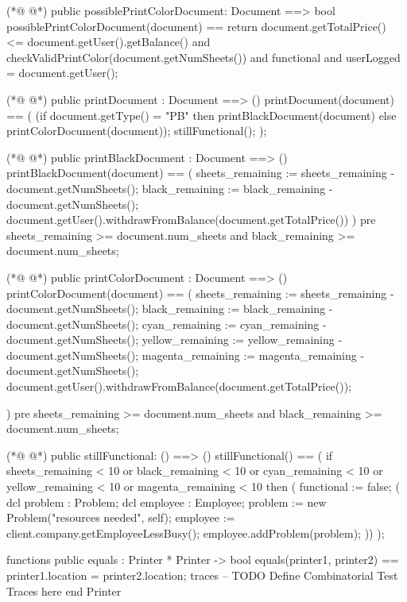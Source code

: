 \begin{vdmpp}[breaklines=true]
(*@
\label{possiblePrintColorDocument:74}
@*)
  public possiblePrintColorDocument: Document ==> bool
  possiblePrintColorDocument(document) ==
  return document.getTotalPrice() <= document.getUser().getBalance() 
   and checkValidPrintColor(document.getNumSheets())
   and functional
   and userLogged = document.getUser();
   
  
(*@
\label{printDocument:82}
@*)
  public printDocument : Document ==> ()
  printDocument(document) ==
  (
  (if document.getType() = "PB"
   then printBlackDocument(document)
   else printColorDocument(document));
    stillFunctional();
  );
  
(*@
\label{printBlackDocument:91}
@*)
  public printBlackDocument : Document ==> ()
  printBlackDocument(document) ==
  (
  sheets_remaining := sheets_remaining - document.getNumSheets();
  black_remaining := black_remaining - document.getNumSheets();
  document.getUser().withdrawFromBalance(document.getTotalPrice())
  )
  pre sheets_remaining >= document.num_sheets and black_remaining >= document.num_sheets;
  
(*@
\label{printColorDocument:100}
@*)
  public printColorDocument : Document ==> ()
  printColorDocument(document) ==
  (
  sheets_remaining := sheets_remaining - document.getNumSheets();
  black_remaining := black_remaining - document.getNumSheets();
  cyan_remaining := cyan_remaining - document.getNumSheets();
  yellow_remaining := yellow_remaining - document.getNumSheets();
  magenta_remaining := magenta_remaining - document.getNumSheets();
  document.getUser().withdrawFromBalance(document.getTotalPrice());

  )
  pre sheets_remaining >= document.num_sheets and black_remaining >= document.num_sheets;
  
(*@
\label{stillFunctional:113}
@*)
  public stillFunctional: () ==> ()
  stillFunctional() == 
  (
  if    sheets_remaining < 10
    or black_remaining < 10
    or cyan_remaining < 10
    or yellow_remaining < 10
    or magenta_remaining < 10
    then ( functional := false; 
    (
    dcl problem : Problem;
    dcl employee : Employee;
    problem := new Problem("resources needed", self);
    employee := client.company.getEmployeeLessBusy();
    employee.addProblem(problem);
    ))
  );
  
functions
public equals : Printer * Printer -> bool
equals(printer1, printer2) ==
  printer1.location = printer2.location;
traces
-- TODO Define Combinatorial Test Traces here
end Printer
\end{vdmpp}
\bigskip
